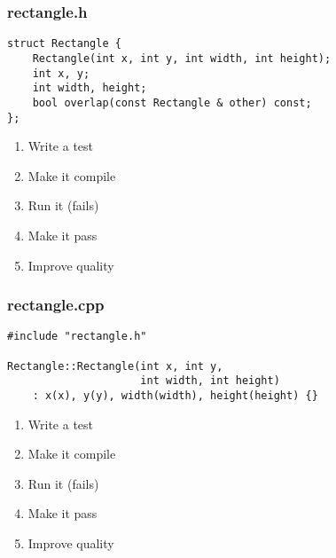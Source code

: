 \begin{frame}[fragile]
\frametitle{rectangle.h}
\begin{minipage}[t]{0.48\linewidth}
\begin{lstlisting}
struct Rectangle {
    Rectangle(int x, int y, int width, int height);
    int x, y;
    int width, height;
    bool overlap(const Rectangle & other) const;
};
\end{lstlisting}
\end{minipage}\hfill
\begin{minipage}[t]{0.28\linewidth}
  \small
  \begin{enumerate} 
    \item \textcolor{deadcolor}{Write a test}
    \item \textcolor{activecolor}{Make it compile}
    \item \textcolor{deadcolor}{Run it (fails)}
    \item \textcolor{deadcolor}{Make it pass}
    \item \textcolor{deadcolor}{Improve quality}
  \end{enumerate} 
\end{minipage}
\end{frame}


\begin{frame}[fragile]
\frametitle{rectangle.cpp}
\begin{minipage}[t]{0.48\linewidth}
\begin{lstlisting}
#include "rectangle.h"

Rectangle::Rectangle(int x, int y, 
                     int width, int height)
    : x(x), y(y), width(width), height(height) {}

\end{lstlisting}
\end{minipage}\hfill
\begin{minipage}[t]{0.28\linewidth}
  \small
  \begin{enumerate} 
    \item \textcolor{deadcolor}{Write a test}
    \item \textcolor{activecolor}{Make it compile}
    \item \textcolor{deadcolor}{Run it (fails)}
    \item \textcolor{deadcolor}{Make it pass}
    \item \textcolor{deadcolor}{Improve quality}
  \end{enumerate} 
\end{minipage}
\end{frame}


